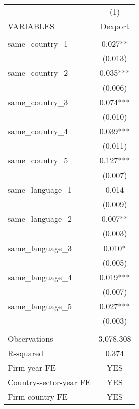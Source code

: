 \begin{tabular}{lc} \hline
 & (1) \\
VARIABLES & Dexport \\ \hline
 &  \\
same\_country\_1 & 0.027** \\
 & (0.013) \\
same\_country\_2 & 0.035*** \\
 & (0.006) \\
same\_country\_3 & 0.074*** \\
 & (0.010) \\
same\_country\_4 & 0.039*** \\
 & (0.011) \\
same\_country\_5 & 0.127*** \\
 & (0.007) \\
same\_language\_1 & 0.014 \\
 & (0.009) \\
same\_language\_2 & 0.007** \\
 & (0.003) \\
same\_language\_3 & 0.010* \\
 & (0.005) \\
same\_language\_4 & 0.019*** \\
 & (0.007) \\
same\_language\_5 & 0.027*** \\
 & (0.003) \\
 &  \\
Observations & 3,078,308 \\
R-squared & 0.374 \\
Firm-year FE & YES \\
Country-sector-year FE & YES \\
 Firm-country FE & YES \\ \hline
\end{tabular}
